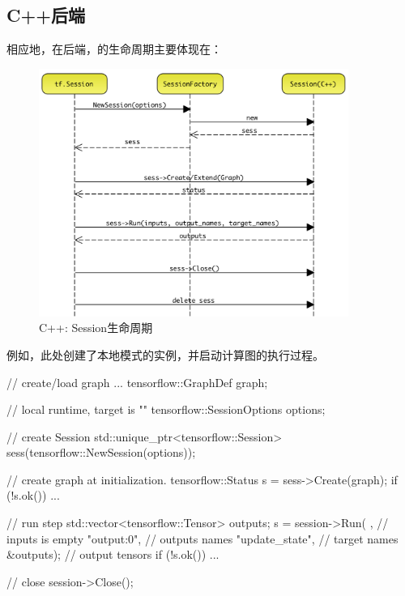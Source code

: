 \begin{content}
\subsection{C++后端}

相应地，在\cpp{}后端，的生命周期主要体现在：

\begin{enum}
\end{enum}

\begin{figure}[H]
\centering
\includegraphics[width=0.9\textwidth]{figures/cc-session-lifecycle.png}
\caption{C++: Session生命周期}
 \label{fig:cc-session-lifecycle}
\end{figure}

例如，此处创建了本地模式的实例，并启动计算图的执行过程。

\begin{leftbar}
\begin{c++}
// create/load graph ...
tensorflow::GraphDef graph;

// local runtime, target is ""
tensorflow::SessionOptions options;

// create Session
std::unique_ptr<tensorflow::Session> 
sess(tensorflow::NewSession(options));

// create graph at initialization.
tensorflow::Status s = sess->Create(graph);
if (!s.ok()) { ... }

// run step
std::vector<tensorflow::Tensor> outputs;
s = session->Run(
  {},               // inputs is empty
  {"output:0"},     // outputs names
  {"update_state"}, // target names
  &outputs);        // output tensors
if (!s.ok()) { ... }

// close
session->Close();
\end{c++}
\end{leftbar}

\end{content}

